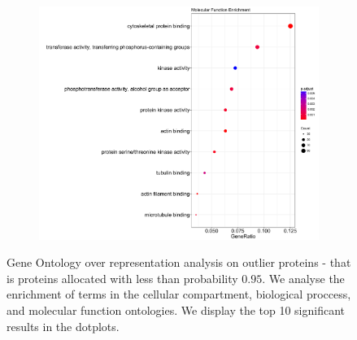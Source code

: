 \documentclass[12pt,english]{article}
\begin{document}
\begin{figure}[h]
\begin{subfigure}[t]{0.5\textwidth}
\centering
\includegraphics[width=\textwidth]{MFenrich.pdf}
        \caption{}
\end{subfigure}
  \caption{Gene Ontology over representation analysis on outlier proteins - that is proteins
  allocated with less than probability $0.95$. We analyse the enrichment of terms
  in the cellular compartment, biological proccess, and molecular function ontologies. We display the top
  10 significant results in the dotplots.}
\label{fig:GOenrich}
\end{figure}




\clearpage



\end{document}
